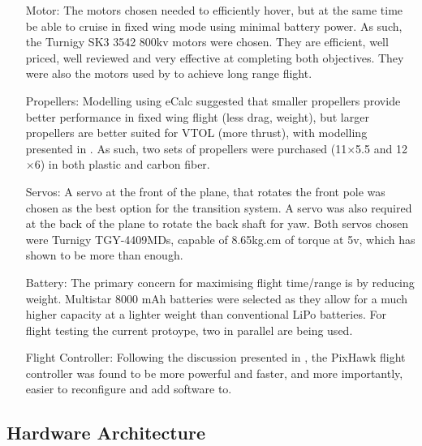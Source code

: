 \begin{itemize}
		\item[Motor:] The motors chosen needed to efficiently hover, but at the same time be able to cruise in fixed wing mode using minimal battery power. As such, the Turnigy SK3 3542 800kv motors were chosen. They are efficient, well priced, well reviewed and very effective at completing both objectives. They were also the motors used by  to achieve long range flight.
	
		\item[Propellers:] Modelling using eCalc suggested that smaller propellers provide better performance in fixed wing flight (less drag, weight), but larger propellers are better suited for VTOL (more thrust), with modelling presented in . As such, two sets of propellers were purchased (11$\times$5.5 and 12$\times$6) in both plastic and carbon fiber.
	
		\item[Servos:] A servo at the front of the plane, that rotates the front pole was chosen as the best option for the transition system. A servo was also required at the back of the plane to rotate the back shaft for yaw. Both servos chosen were Turnigy TGY-4409MDs, capable of 8.65kg.cm of torque at 5v, which has shown to be more than enough. 
		
		\item[Battery:] The primary concern for maximising flight time/range is by reducing weight. Multistar 8000 mAh batteries were selected as they allow for a much higher capacity at a lighter weight than conventional LiPo batteries. For flight testing the current protoype, two in parallel are being used. 
	
		\item[Flight Controller:] Following the discussion presented in \cite{ref:controller_comparison}, the PixHawk flight controller was found to be more powerful and faster, and more importantly, easier to reconfigure and add software to.
		
	\end{itemize}
\subsection{Hardware Architecture}

